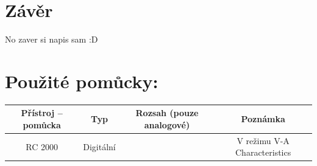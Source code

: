 \documentclass[a4paper]{article}
\begin{document}
\section*{Závěr}
No zaver si napis sam :D

\vfill
\section*{Použité pomůcky:}
\begin{tabularx}{\linewidth}{c|c|c|c}
	Přístroj – pomůcka & Typ & Rozsah (pouze analogové)
	& Poznámka \\
	\hline
	RC 2000 & Digitální && V režimu V-A Characteristics
\end{tabularx}
\end{document}
